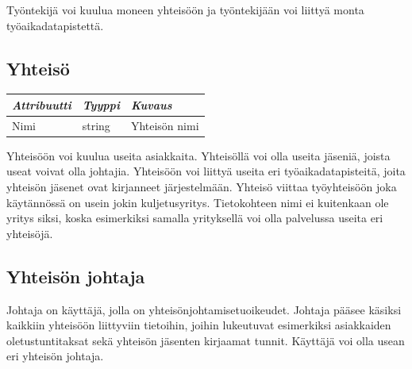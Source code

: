 \documentclass[a4paper, 12pt finnish]{article}
\begin{document}
Työntekijä voi kuulua moneen yhteisöön ja työntekijään voi liittyä
monta työaikadatapistettä.

\subsection{Yhteisö}
\begin{center}
\begin{tabular}{| l | l | l |}
    \hline
    \emph{Attribuutti} & \emph{Tyyppi} & \emph{Kuvaus} \\ \hline
    Nimi & string & Yhteisön nimi \\ \hline
\end{tabular}
\end{center}

Yhteisöön voi kuulua useita asiakkaita. Yhteisöllä voi olla useita
jäseniä, joista useat voivat olla johtajia. Yhteisöön voi liittyä
useita eri työaikadatapisteitä, joita yhteisön jäsenet ovat kirjanneet
järjestelmään. Yhteisö viittaa työyhteisöön joka käytännössä on usein
jokin kuljetusyritys. Tietokohteen nimi ei kuitenkaan ole yritys siksi,
koska esimerkiksi samalla yrityksellä voi olla palvelussa useita eri 
yhteisöjä.

\subsection{Yhteisön johtaja}
Johtaja on käyttäjä, jolla on yhteisönjohtamisetuoikeudet. Johtaja pääsee
käsiksi kaikkiin yhteisöön liittyviin tietoihin, joihin lukeutuvat
esimerkiksi asiakkaiden oletustuntitaksat sekä yhteisön jäsenten 
kirjaamat tunnit. Käyttäjä voi olla usean eri yhteisön johtaja.


\newpage
\end{document}
